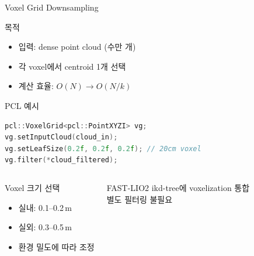 \begin{frame}[fragile]{Voxel Grid Downsampling}
  \begin{block}{목적}
    \begin{itemize}
      \item 입력: dense point cloud (수만 개)
      \item 각 voxel에서 centroid 1개 선택
      \item 계산 효율: $O(N) \to O(N/k)$
    \end{itemize}
  \end{block}
  \pause
  \begin{exampleblock}{PCL 예시}
\begin{lstlisting}[language=C++]
pcl::VoxelGrid<pcl::PointXYZI> vg;
vg.setInputCloud(cloud_in);
vg.setLeafSize(0.2f, 0.2f, 0.2f); // 20cm voxel
vg.filter(*cloud_filtered);
\end{lstlisting}
  \end{exampleblock}
  \pause
  \begin{columns}
    \begin{block}{Voxel 크기 선택}
      \begin{itemize}
        \item 실내: 0.1--0.2\,m
        \item 실외: 0.3--0.5\,m
        \item 환경 밀도에 따라 조정
      \end{itemize}
    \end{block}
    \begin{block}{FAST-LIO2}
      ikd-tree에 voxelization 통합\\
      별도 필터링 불필요
    \end{block}
  \end{columns}
\end{frame}

